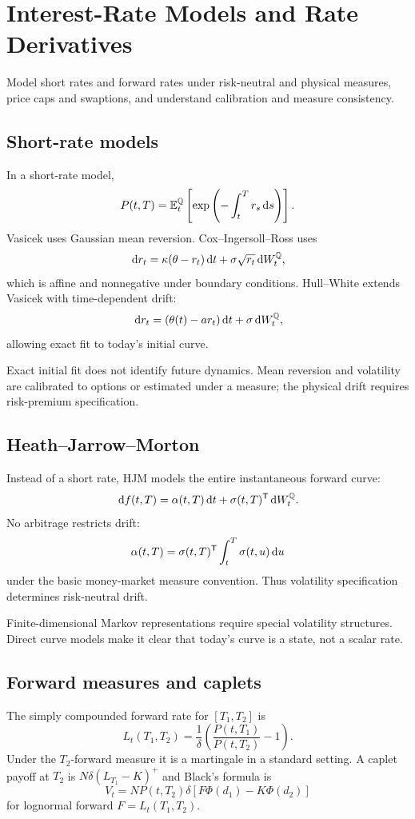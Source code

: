 \chapter{Interest-Rate Models and Rate Derivatives}

\begin{objectives}
Model short rates and forward rates under risk-neutral and physical measures, price
caps and swaptions, and understand calibration and measure consistency.
\end{objectives}

\section{Short-rate models}

In a short-rate model,
\[
P(t,T)=\operatorname{\mathbb E}_t^\mathbb Q\left[\exp\left(-\int_t^Tr_s\,\mathrm d s\right)\right].
\]
Vasicek uses Gaussian mean reversion. Cox--Ingersoll--Ross uses
\[
\,\mathrm d r_t=\kappa(\theta-r_t)\,\mathrm d t+\sigma\sqrt{r_t}\,\mathrm d W_t^\mathbb Q,
\]
which is affine and nonnegative under boundary conditions. Hull--White extends
Vasicek with time-dependent drift:
\[
\,\mathrm d r_t=(\theta(t)-a r_t)\,\mathrm d t+\sigma\,\mathrm d W_t^\mathbb Q,
\]
allowing exact fit to today's initial curve.

Exact initial fit does not identify future dynamics. Mean reversion and volatility
are calibrated to options or estimated under a measure; the physical drift requires
risk-premium specification.

\section{Heath--Jarrow--Morton}

Instead of a short rate, HJM models the entire instantaneous forward curve:
\[
\,\mathrm d f(t,T)=\alpha(t,T)\,\mathrm d t+\sigma(t,T)^\mathsf T\,\mathrm d W_t^\mathbb Q.
\]
No arbitrage restricts drift:
\[
\alpha(t,T)=
\sigma(t,T)^\mathsf T\int_t^T\sigma(t,u)\,\mathrm d u
\]
under the basic money-market measure convention. Thus volatility specification
determines risk-neutral drift.

Finite-dimensional Markov representations require special volatility structures.
Direct curve models make it clear that today's curve is a state, not a scalar rate.

\section{Forward measures and caplets}

The simply compounded forward rate for $[T_1,T_2]$ is
\[
L_t(T_1,T_2)=
\frac{1}{\delta}\left(
\frac{P(t,T_1)}{P(t,T_2)}-1
\right).
\]
Under the $T_2$-forward measure it is a martingale in a standard setting. A caplet
payoff at $T_2$ is
$N\delta(L_{T_1}-K)^+$ and Black's formula is
\[
V_t=NP(t,T_2)\delta
[F\Phi(d_1)-K\Phi(d_2)]
\]
for lognormal forward $F=L_t(T_1,T_2)$.

